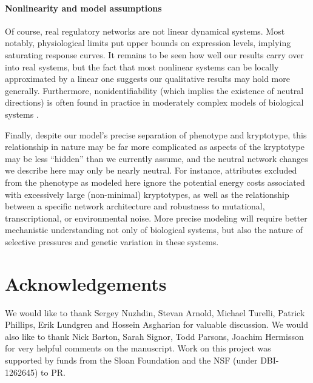 \documentclass{article}
\newcommand{\1}{\mathbbm{1}}
\begin{document}
\paragraph{Nonlinearity and model assumptions}
Of course, real regulatory networks are not linear dynamical systems.
Most notably, physiological limits put upper bounds on expression levels,
implying saturating response curves.
It remains to be seen how well our results carry over into real systems,
but the fact that most nonlinear systems can be locally approximated by a linear one
suggests our qualitative results may hold more generally. 
Furthermore, nonidentifiability (which implies the existence of neutral directions)
is often found in practice in moderately complex models of biological systems \citep{gutenkunst2007universally, piazza2008diverse}.

Finally, despite our model's precise separation of phenotype and kryptotype, this relationship in nature may be far more complicated as aspects of the kryptotype may be less ``hidden'' than we currently assume, and the neutral network changes we describe here may only be nearly neutral. For instance, attributes excluded from the phenotype as modeled here ignore the potential energy costs associated with excessively large (non-minimal) kryptotypes, as well as the relationship between a specific network architecture and robustness to mutational, transcriptional, or environmental noise.
More precise modeling will require better mechanistic understanding not only of biological systems,
but also the nature of selective pressures
and genetic variation in these systems.

%

\section*{Acknowledgements}

    We would like to thank Sergey Nuzhdin, Stevan Arnold, Michael Turelli, Patrick Phillips, Erik Lundgren and Hossein Asgharian for valuable discussion. 
    We would also like to thank Nick Barton, Sarah Signor, Todd Parsons, Joachim Hermisson for very helpful comments on the manuscript.
    Work on this project was supported by funds from
    the Sloan Foundation and the NSF (under DBI-1262645) to PR.
\end{document}
